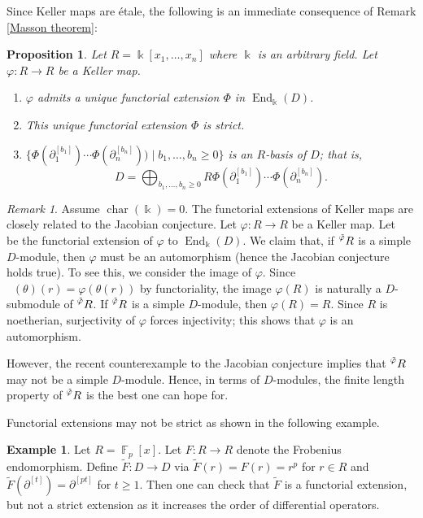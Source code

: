 \documentclass[11pt]{amsart}
\newtheorem{proposition}[theorem]{Proposition}
\theoremstyle{definition}
\newtheorem{example}[theorem]{Example}
\theoremstyle{remark}
\newtheorem{remark}[theorem]{Remark}
\numberwithin{equation}{subsection}
\DeclareMathOperator{\kk}{\Bbbk}
\DeclareMathOperator{\tv}{\tilde{\varphi}}
\DeclareMathOperator{\FF}{\mathbb{F}}
\DeclareMathOperator{\ch}{char}
\DeclareMathOperator{\End}{End}
\begin{document}
Since Keller maps are \'{e}tale, the following is an immediate consequence of Remark \ref{Masson theorem}:
\begin{proposition}
\label{Keller admit functorial}
Let $R=\kk[x_1,\dots,x_n]$ where $\kk$ is an arbitrary field. Let $\varphi:R\to R$ be a Keller map.
\begin{enumerate}
\item $\varphi$ admits a unique functorial extension $\Phi$ in $\End_{\kk}(D)$.
\item This unique functorial extension $\Phi$ is strict.
\item 
\label{Keller induce basis of D}
$\{\Phi(\partial^{[b_1]}_1)\cdots \Phi(\partial^{[b_n]}_n))\mid b_1,\dots,b_n\geq 0\}$ is an $R$-basis of $D$; that is, 
\[D= \bigoplus_{b_1,\dots,b_n\geq 0} R \Phi(\partial^{[b_1]}_1)\cdots \Phi(\partial^{[b_n]}_n).\]
\end{enumerate}
\end{proposition}

\begin{remark}
\label{connection between extension and jacobian}
Assume $\ch(\kk)=0$. The functorial extensions of Keller maps are closely related to the Jacobian conjecture. Let $\varphi:R\to R$ be a Keller map. Let $\tv$ be the functorial extension of $\varphi$ to $\End_{\kk}(D)$. We claim that, if $\prescript{\tv}{}R$ is a simple $D$-module, then $\varphi$ must be an automorphism (hence the Jacobian conjecture holds true). To see this, we consider the image of $\varphi$. Since $\tv(\theta)(r)=\varphi(\theta(r))$ by functoriality, the image $\varphi(R)$ is naturally a $D$-submodule of $\prescript{\tv}{}R$. If $\prescript{\tv}{}R$ is a simple $D$-module, then $\varphi(R)=R$. Since $R$ is noetherian, surjectivity of $\varphi$ forces injectivity; this shows that $\varphi$ is an automorphism.

However, the recent counterexample to the Jacobian conjecture implies that $\prescript{\tv}{}R$ may not be a simple $D$-module. Hence, in terms of $D$-modules, the finite length property of $\prescript{\tv}{}R$ is the best one can hope for. 
\end{remark}



Functorial extensions may not be strict as shown in the following example.
\begin{example}
Let $R=\FF_p[x]$. Let $F:R\to R$ denote the Frobenius endomorphism. Define $\tilde{F}:D\to D$ via $\tilde{F}(r)=F(r)=r^p$ for $r\in R$ and $\tilde{F}(\partial^{[t]})=\partial^{[pt]}$ for $t\geq 1$. Then one can check that $\tilde{F}$ is a functorial extension, but not a strict extension as it increases the order of differential operators.
\end{example}
\end{document}
